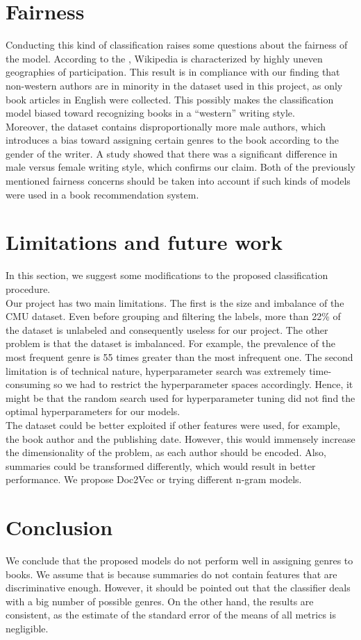 \documentclass{article}
\begin{document}
\section{Fairness}
Conducting this kind of classification raises some questions about the fairness of the model. 
According to the \cite{graham2015digital}, Wikipedia is characterized by highly uneven geographies of participation. This result is in compliance with our finding that non-western authors are in minority in the dataset used in this project, as only book articles in English were collected. This possibly makes the classification model biased toward recognizing books in a “western” writing style. \\
Moreover, the dataset contains disproportionally more male authors, which introduces a bias toward assigning certain genres to the book according to the gender of the writer. A study \cite{argamon2003gender} showed that there was a significant difference in male versus female writing style, which confirms our claim.
Both of the previously mentioned fairness concerns should be taken into account if such kinds of models were used in a book recommendation system.

\section{Limitations and future work}
In this section, we suggest some modifications to the proposed classification procedure. \\
Our project has two main limitations. The first is the size and imbalance of the CMU dataset. Even before grouping and filtering the labels, more than 22\% of the dataset is unlabeled and consequently useless for our project. The other problem is that the dataset is imbalanced. For example, the prevalence of the most frequent genre is 55 times greater than the most infrequent one. The second limitation is of technical nature, hyperparameter search was extremely time-consuming so we had to restrict the hyperparameter spaces accordingly. Hence, it might be that the random search used for hyperparameter tuning did not find the optimal hyperparameters for our models. \\
The dataset could be better exploited if other features were used, for example, the book author and the publishing date. However, this would immensely increase the dimensionality of the problem, as each author should be encoded. Also, summaries could be transformed differently, which would result in better performance. We propose Doc2Vec\cite{le2014distributed} or trying different n-gram models. 

\section{Conclusion}
We conclude that the proposed models do not perform well in assigning genres to books. We assume that is because summaries do not contain features that are discriminative enough. However, it should be pointed out that the classifier deals with a big number of possible genres. On the other hand, the results are consistent, as the estimate of the standard error of the means of all metrics is negligible.

\printbibliography
\end{document}

